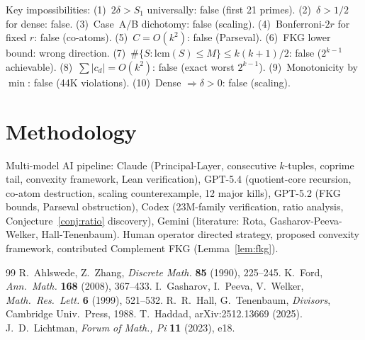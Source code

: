 \documentclass[11pt,a4paper]{article}
\theoremstyle{definition}
\begin{document}
Key impossibilities: (1)~$2\delta > S_1$ universally: false (first 21
primes). (2)~$\delta > 1/2$ for dense: false. (3)~Case~A/B dichotomy:
false (scaling). (4)~Bonferroni-$2r$ for fixed $r$: false (co-atoms).
(5)~$C = O(k^2)$: false (Parseval). (6)~FKG lower bound: wrong
direction. (7)~$\#\{S : \mathrm{lcm}(S) \leq M\} \leq k(k{+}1)/2$:
false ($2^{k-1}$ achievable). (8)~$\sum|c_d| = O(k^2)$: false
(exact worst $2^{k-1}$). (9)~Monotonicity by $\min$: false (44K
violations). (10)~Dense $\Rightarrow \delta > 0$: false (scaling).

\section{Methodology}

Multi-model AI pipeline: Claude (Principal-Layer, consecutive
$k$-tuples, coprime tail, convexity framework, Lean verification),
GPT-5.4 (quotient-core recursion, co-atom destruction, scaling
counterexample, 12 major kills), GPT-5.2 (FKG bounds, Parseval
obstruction), Codex (23M-family verification, ratio analysis,
Conjecture~\ref{conj:ratio} discovery), Gemini (literature:
Rota, Gasharov-Peeva-Welker, Hall-Tenenbaum). Human operator directed
strategy, proposed convexity framework, contributed Complement FKG
(Lemma~\ref{lem:fkg}).

\begin{thebibliography}{99}
 R.~Ahlswede, Z.~Zhang, \emph{Discrete Math.}
\textbf{85} (1990), 225--245.
 K.~Ford, \emph{Ann.\ Math.} \textbf{168} (2008),
367--433.
 I.~Gasharov, I.~Peeva, V.~Welker, \emph{Math.\ Res.\
Lett.} \textbf{6} (1999), 521--532.
 R.~R.~Hall, G.~Tenenbaum, \emph{Divisors}, Cambridge
Univ.\ Press, 1988.
 T.~Haddad, arXiv:2512.13669 (2025).
 J.~D.~Lichtman, \emph{Forum of Math., Pi} \textbf{11}
(2023), e18.
\end{thebibliography}
\end{document}
